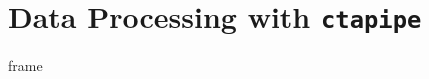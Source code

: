 \section{Data Processing with \texttt{ctapipe}}%
\label{sec:data_processing}
\begin{frame}
    frame
\end{frame}